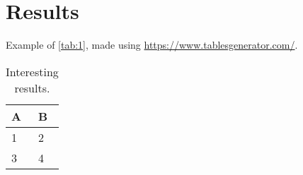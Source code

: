 
\chapter{Results}
\label{chp:results}

Example of \autoref{tab:1}, made using \url{https://www.tablesgenerator.com/}.


\begin{table}
    \captionsetup{justification=centering}
    \centering
    \begin{tabular}{@{}ll@{}}
        \toprule
        \textbf{A} & \textbf{B} \\ \midrule
        1          & 2          \\
        3          & 4          \\ \bottomrule
    \end{tabular}
    \caption{Interesting results.}
    \label{tab:1}
\end{table}